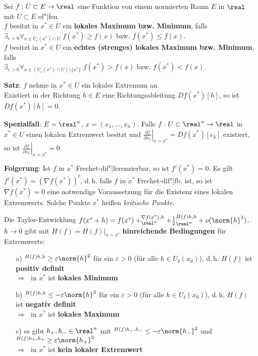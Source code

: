 Sei $f: U \subset E \rightarrow \real$ eine Funktion von einem normierten
Raum $E$ in $\real$ mit $U \subset E$ of"|fen. \\
$f$ besitzt in $x^\ast \in U$ ein \textbf{lokales Maximum bzw. Minimum},
falls \\
$\exists_{\varepsilon > 0} \forall_{x \in U_\varepsilon(x^\ast) \cap U}\;
f(x^\ast) \ge f(x)$ bzw. $f(x^\ast) \le f(x)$. \\
$f$ besitzt in $x^\ast \in U$ ein
\textbf{echtes (strenges) lokales Maximum bzw. Minimum}, falls \\
$\exists_{\varepsilon > 0} \forall_{x \in
(U_\varepsilon(x^\ast) \cap U) \setminus \{x^\ast\}}\;
f(x^\ast) > f(x)$ bzw. $f(x^\ast) < f(x)$.

\linie

\textbf{Satz}:
$f$ nehme in $x^\ast \in U$ ein lokales Extremum an. \\
Existiert in der Richtung $h \in E$ eine Richtungsableitung
$Df(x^\ast)[h]$, so ist $Df(x^\ast)[h] = 0$.

\textbf{Spezialfall}:
$E = \real^n$, $x = (x_1, \dotsc, x_n)$.
Falls $f: U \subset \real^n \rightarrow \real$ in $x^\ast \in U$ einen
lokalen Extremwert besitzt und
$\left.\frac{\partial f}{\partial x_k}\right|_{x=x^\ast} = Df(x^\ast)[e_k]$
existiert, so ist
$\left.\frac{\partial f}{\partial x_k}\right|_{x=x^\ast} = 0$.

\textbf{Folgerung}:
Ist $f$ in $x^\ast$ Frechet-dif"|ferenzierbar, so ist
$f'(x^\ast) = 0$.
Es gilt $f'(x^\ast) = (\nabla f(x^\ast))^t$, d.\,h.
falls $f$ in $x^\ast$ Frechet-dif"|fb. ist, so ist $\nabla f(x^\ast) = 0$
eine notwendige Voraussetzung für die Existenz eines lokalen Extremwerts.
Solche Punkte $x^\ast$ heißen \emph{kritische Punkte}.

\linie

Die Taylor-Entwicklung
$f(x^\ast + h) = f(x^\ast) + \sp{\nabla f(x^\ast), h}_{\real^n} +
\frac{1}{2} \sp{H(f)h, h}_{\real^n} + o(\norm{h}^2)$, $h \to 0$
gibt mit $H(f) = \left.H(f)\right|_{x=x^\ast}$
\textbf{hinreichende Bedingungen} für Extremwerte:
\begin{itemize}
    \item[a)]
    $\sp{H(f)h, h} \ge \varepsilon \norm{h}^2$ für ein $\varepsilon > 0$
    (für alle $h \in U_\delta(x_0)$), d.\,h. $H(f)$ ist
    \textbf{positiv definit} \\
    $\Rightarrow\;$ in $x^\ast$ ist \textbf{lokales Minimum}

    \item[b)]
    $\sp{H(f)h, h} \le -\varepsilon \norm{h}^2$ für ein $\varepsilon > 0$
    (für alle $h \in U_\delta(x_0)$), d.\,h. $H(f)$ ist
    \textbf{negativ definit} \\
    $\Rightarrow\;$ in $x^\ast$ ist \textbf{lokales Maximum}

    \item[c)]
    es gibt $h_+, h_- \in \real^n$ mit
    $\sp{H(f)h_-, h_-} \le -\varepsilon \norm{h_-}^2$ und
    $\sp{H(f)h_+, h_+} \ge \varepsilon \norm{h_+}^2$ \\
    $\Rightarrow\;$ in $x^\ast$ ist \textbf{kein lokaler Extremwert}
\end{itemize}


